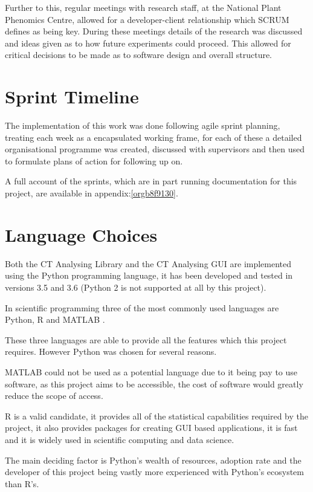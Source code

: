 \documentclass[11pt]{report}
\begin{document}
Further to this, regular meetings with research staff, at the National Plant Phenomics Centre,  allowed for a developer-client relationship which SCRUM defines as being key. During these meetings details of the research was discussed and ideas given as to how future experiments could proceed. This allowed for critical decisions to be made as to software design and overall structure.
\section{Sprint Timeline}
\label{sec:orge6393ad}
The implementation of this work was done following agile sprint planning, treating each week as a encapsulated working frame, for each of these a detailed organisational programme was created, discussed with supervisors and then used to formulate plans of action for following up on.

A full account of the sprints, which are in part running documentation for this project, are available in appendix:\ref{orgb8f9130}.

\section{Language Choices}
\label{sec:org75e000d}
Both the CT Analysing Library and the CT Analysing GUI are implemented using the Python programming language, it has been developed and tested in versions 3.5 and 3.6 (Python 2 is not supported at all by this project).

In scientific programming three of the most commonly used languages are Python, R and MATLAB \cite{Ozgur2016}.

These three languages are able to provide all the features which this project requires. However Python was chosen for several reasons.

MATLAB could not be used as a potential language due to it being pay to use software, as this project aims to be accessible, the cost of software would greatly reduce the scope of access.

R is a valid candidate, it provides all of the statistical capabilities required by the project, it also provides packages for creating GUI based applications, it is fast and it is widely used in scientific computing and data science.

The main deciding factor is Python's wealth of resources, adoption rate and the developer of this project being vastly more experienced with Python's ecosystem than R's.
\end{document}
